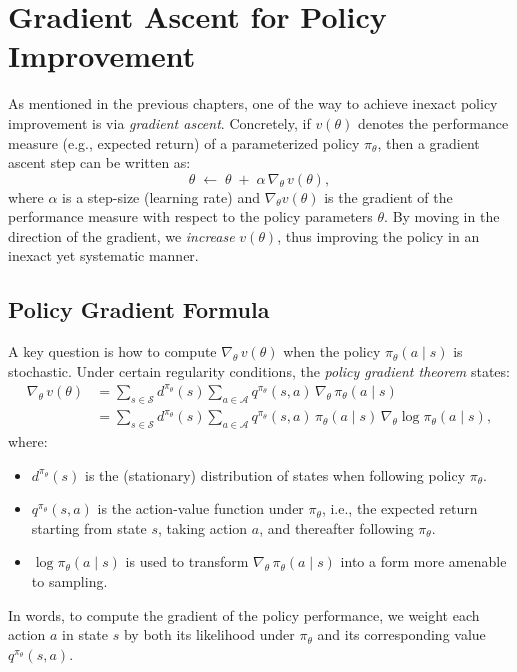 \section{Gradient Ascent for Policy Improvement}
\label{sec:gradient_ascent}

As mentioned in the previous chapters, one of the way to achieve inexact policy improvement is via \emph{gradient ascent}. Concretely, if $v(\theta)$ denotes the performance measure (e.g., expected return) of a parameterized policy $\pi_\theta$, then a gradient ascent step can be written as:
\begin{equation}
  \theta \;\leftarrow\; \theta \;+\; \alpha \,\nabla_\theta \,v(\theta),
  \label{eq:gradient_ascent_update}
\end{equation}
where $\alpha$ is a step-size (learning rate) and $\nabla_\theta v(\theta)$ is the gradient of the performance measure with respect to the policy parameters $\theta$. By moving in the direction of the gradient, we \emph{increase} $v(\theta)$, thus improving the policy in an inexact yet systematic manner.

\subsection{Policy Gradient Formula}
\label{sec:policy_gradient_formula}

A key question is how to compute $\nabla_\theta \, v(\theta)$ when the policy $\pi_\theta(a \mid s)$ is stochastic. Under certain regularity conditions, the \emph{policy gradient theorem} states:
\begin{align}
  \nabla_\theta \,v(\theta) 
  &= \sum_{s \in \mathcal{S}} d^{\pi_\theta}(s) \sum_{a \in \mathcal{A}} 
     q^{\pi_\theta}(s, a)\,\nabla_\theta \,\pi_\theta(a \mid s) 
  \label{eq:pg_theorem_original}\\[6pt]
  &= \sum_{s \in \mathcal{S}} d^{\pi_\theta}(s) \sum_{a \in \mathcal{A}}
     q^{\pi_\theta}(s, a)\,\pi_\theta(a \mid s)\,\nabla_\theta \log \pi_\theta(a \mid s),
  \label{eq:pg_theorem_log}
\end{align}
where:
\begin{itemize}
  \item $d^{\pi_\theta}(s)$ is the (stationary) distribution of states when following policy $\pi_\theta$.
  \item $q^{\pi_\theta}(s, a)$ is the action-value function under $\pi_\theta$, i.e., the expected return starting from state $s$, taking action $a$, and thereafter following $\pi_\theta$.
  \item $\log \pi_\theta(a \mid s)$ is used to transform $\nabla_\theta \,\pi_\theta(a \mid s)$ into a form more amenable to sampling.
\end{itemize}
In words, to compute the gradient of the policy performance, we weight each action $a$ in state $s$ by both its likelihood under $\pi_\theta$ and its corresponding value $q^{\pi_\theta}(s,a)$. 

